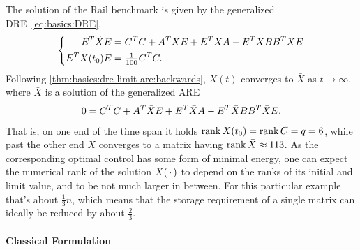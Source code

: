 \begin{example}
\label{thm:lowrank:rail}
  The solution of the Rail benchmark \cite{morwiki_steel} is given by the generalized \ac{DRE}~\eqref{eq:basics:DRE},
  \begin{equation*}
  \left\{
  \begin{aligned}
    E^T \dot X E &= C^T C + A^T X E + E^T X A - E^T X BB^T X E \\
    E^T X(t_0) E &= \tfrac{1}{100} C^T C
    .
  \end{aligned}
  \right.
  \end{equation*}
  Following \autoref{thm:basics:dre-limit-are:backwards},
  $X(t)$ converges to $\bar X$ as $t\to\infty$,
  where $\bar X$ is a solution of the generalized \ac{ARE}
  \begin{equation*}
    0 = C^T C + A^T \bar X E + E^T \bar X A - E^T \bar X BB^T \bar X E
    .
  \end{equation*}
  That is, on one end of the time span it holds $\operatorname{rank} X(t_0) = \operatorname{rank} C = q = 6$,
  while past the other end $X$ converges to a matrix having $\operatorname{rank} \bar X \approx 113$.
  As the corresponding optimal control has some form of minimal energy,
  one can expect the numerical rank of the solution $X(\optional{})$ to depend on the ranks of its initial and limit value,
  and to be not much larger in between.
  For this particular example that's about $\frac{1}{3}n$,
  which means that the storage requirement of a single matrix can ideally be reduced by about $\frac{2}{3}$.
\end{example}

%
%
%
%
%
%

\paragraph{Classical Formulation}

